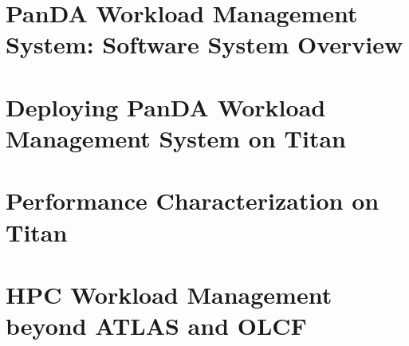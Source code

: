 \documentclass[smallextended]{svjour3}      %
\begin{document}

\section{PanDA Workload Management System: Software System Overview}
\label{sec:overview}



\section{Deploying PanDA Workload Management System on Titan}
\label{sec:deploying}



\section{Performance Characterization on Titan}
\label{sec:performance}




\section{HPC Workload Management beyond ATLAS and OLCF}
\label{sec:beyond-atlas-and-olcf}



\end{document}
